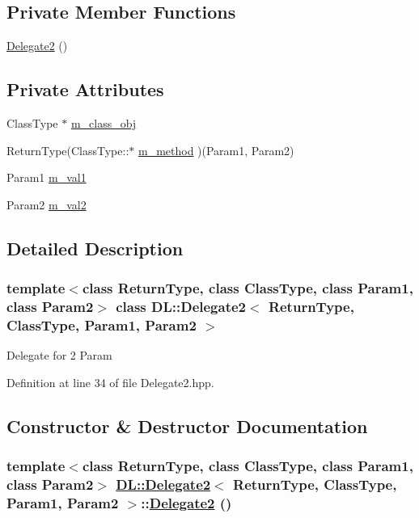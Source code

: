 \subsection*{Private Member Functions}
\begin{CompactItemize}
\item 
\hyperlink{classDL_1_1Delegate2_d0}{Delegate2} ()
\end{CompactItemize}
\subsection*{Private Attributes}
\begin{CompactItemize}
\item 
Class\-Type $\ast$ \hyperlink{classDL_1_1Delegate2_r0}{m\_\-class\_\-obj}
\item 
Return\-Type(Class\-Type::$\ast$ \hyperlink{classDL_1_1Delegate2_r1}{m\_\-method} )(Param1, Param2)
\item 
Param1 \hyperlink{classDL_1_1Delegate2_r2}{m\_\-val1}
\item 
Param2 \hyperlink{classDL_1_1Delegate2_r3}{m\_\-val2}
\end{CompactItemize}


\subsection{Detailed Description}
\subsubsection*{template$<$class Return\-Type, class Class\-Type, class Param1, class Param2$>$ class DL::Delegate2$<$ Return\-Type, Class\-Type, Param1, Param2 $>$}

Delegate for 2 Param



Definition at line 34 of file Delegate2.hpp.

\subsection{Constructor \& Destructor Documentation}
\hypertarget{classDL_1_1Delegate2_d0}{
\subsubsection[Delegate2]{\setlength{\rightskip}{0pt plus 5cm}template$<$class Return\-Type, class Class\-Type, class Param1, class Param2$>$ \hyperlink{classDL_1_1Delegate2}{DL::Delegate2}$<$ Return\-Type, Class\-Type, Param1, Param2 $>$::\hyperlink{classDL_1_1Delegate2}{Delegate2} ()}}
\label{classDL_1_1Delegate2_d0}




